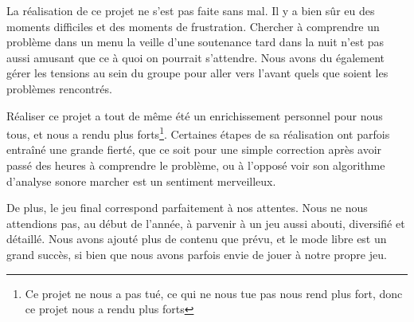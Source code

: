 \par La réalisation de ce projet ne s'est pas faite sans mal. Il y a bien sûr eu des moments difficiles et des moments de frustration. Chercher à comprendre un problème dans un menu la veille d'une soutenance tard dans la nuit n'est pas aussi amusant que ce à quoi on pourrait s'attendre. Nous avons du également gérer les tensions au sein du groupe pour aller vers l'avant quels que soient les problèmes rencontrés.
\par Réaliser ce projet a tout de même été un enrichissement personnel pour nous tous, et nous a rendu plus forts\footnote{Ce projet ne nous a pas tué, ce qui ne nous tue pas nous rend plus fort, donc ce projet nous a rendu plus forts}. Certaines étapes de sa réalisation ont parfois entraîné une grande fierté, que ce soit pour une simple correction après avoir passé des heures à comprendre le problème, ou à l'opposé voir son algorithme d'analyse sonore marcher est un sentiment merveilleux.
\par De plus, le jeu final correspond parfaitement à nos attentes. Nous ne nous attendions pas, au début de l'année, à parvenir à un jeu aussi abouti, diversifié et détaillé. Nous avons ajouté plus de contenu que prévu, et le mode libre est un grand succès, si bien que nous avons parfois envie de jouer à notre propre jeu.